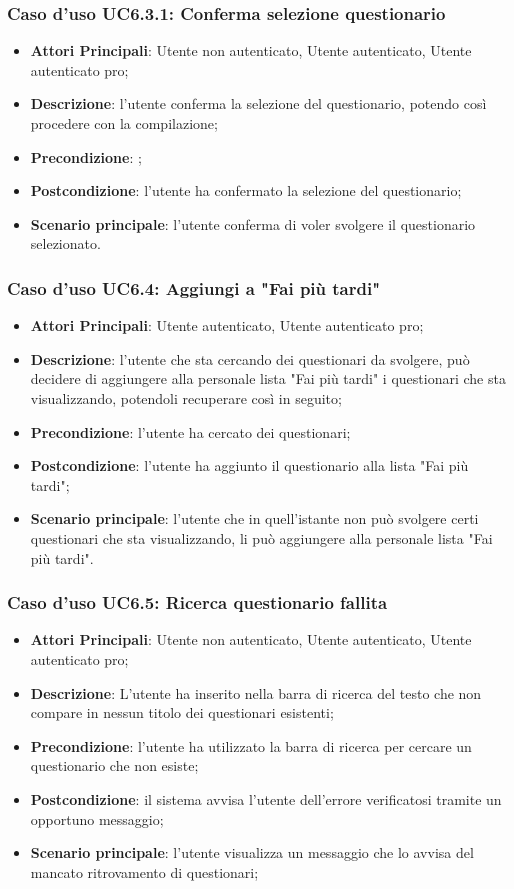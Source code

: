 \subsubsection{Caso d'uso UC6.3.1: Conferma selezione questionario}
\begin{itemize}
\item\textbf{Attori Principali}: Utente non autenticato, Utente autenticato, Utente autenticato pro;
\item\textbf{Descrizione}: l'utente conferma la selezione del questionario, potendo così procedere con la compilazione;
\item\textbf{Precondizione}: ;
\item\textbf{Postcondizione}: l'utente ha confermato la selezione del questionario;
\item\textbf{Scenario principale}: l'utente conferma di voler svolgere il questionario selezionato.
\end{itemize}

\subsubsection{Caso d'uso UC6.4: Aggiungi a "Fai più tardi"}
\begin{itemize}
\item\textbf{Attori Principali}: Utente autenticato, Utente autenticato pro;
\item\textbf{Descrizione}: l'utente che sta cercando dei questionari da svolgere, può decidere di aggiungere alla personale lista "Fai più tardi" i questionari che sta visualizzando, potendoli recuperare così in seguito;
\item\textbf{Precondizione}: l'utente ha cercato dei questionari;
\item\textbf{Postcondizione}: l'utente ha aggiunto il questionario alla lista "Fai più tardi";
\item\textbf{Scenario principale}: l'utente che in quell'istante non può svolgere certi questionari che sta visualizzando, li può aggiungere alla personale lista "Fai più tardi".
\end{itemize}

\subsubsection{Caso d'uso UC6.5: Ricerca questionario fallita}
\begin{itemize}
\item\textbf{Attori Principali}: Utente non autenticato, Utente autenticato, Utente autenticato pro;
\item\textbf{Descrizione}: L'utente ha inserito nella barra di ricerca del testo che non compare in nessun titolo dei questionari esistenti;
\item\textbf{Precondizione}: l'utente ha utilizzato la barra di ricerca per cercare un questionario che non esiste;
\item\textbf{Postcondizione}: il sistema avvisa l'utente dell'errore verificatosi tramite un opportuno messaggio;
\item\textbf{Scenario principale}: l'utente visualizza un messaggio che lo avvisa del mancato ritrovamento di questionari;
\end{itemize}